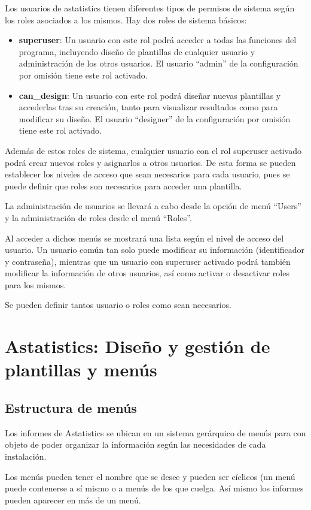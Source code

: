 \documentclass[spanish,12pt]{book}
\begin{document}
Los usuarios de astatistics tienen diferentes tipos de permisos de sistema según los roles asociados a los mismos. Hay dos roles de sistema básicos:

\begin{itemize}
\item {\bf superuser}: Un usuario con este rol podrá acceder a todas las funciones del programa, incluyendo diseño de plantillas de cualquier usuario y administración de los otros usuarios. El usuario ``admin'' de la configuración por omisión tiene este rol activado.
\item {\bf can\_design}: Un usuario con este rol podrá diseñar nuevas plantillas y accederlas tras su creación, tanto para visualizar resultados como para modificar su diseño. El usuario ``designer'' de la configuración por omisión tiene este rol activado.
\end{itemize}

Además de estos roles de sistema, cualquier usuario con el rol superuser activado podrá crear nuevos roles y asignarlos a otros usuarios. De esta forma se pueden establecer los niveles de acceso que sean necesarios para cada usuario, pues se puede definir que roles son necesarios para acceder una plantilla.

La administración de usuarios se llevará a cabo desde la opción de menú ``Users'' y la administración de roles desde el menú ``Roles''.

Al acceder a dichos menús se mostrará una lista según el nivel de acceso del usuario. Un usuario común tan solo puede modificar su información (identificador y contraseña), mientras que un usuario con superuser activado podrá también modificar la información de otros usuarios, así como activar o desactivar roles para los mismos.

Se pueden definir tantos usuario o roles como sean necesarios.

\chapter{Astatistics: Diseño y gestión de plantillas y menús}
\section{Estructura de menús}
Los informes de Astatistics se ubican en un sistema gerárquico de menús para con objeto de poder organizar la información según las necesidades de cada instalación.

Los menús pueden tener el nombre que se desee y pueden ser cíclicos (un menú puede contenerse a sí mismo o a menús de los que cuelga. Así mismo los informes pueden aparecer en más de un menú.
\end{document}
